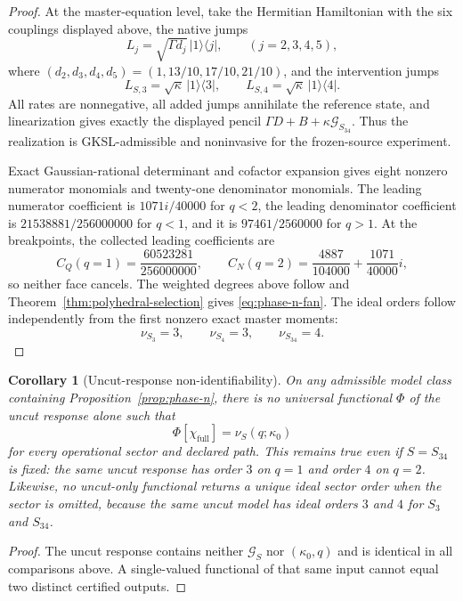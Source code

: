 \documentclass[11pt]{article}
\newtheorem{corollary}[theorem]{Corollary}
\theoremstyle{definition}
\theoremstyle{remark}
\theoremstyle{plain}
\newcommand{\full}{\mathrm{full}}
\newcommand{\Gcut}{\mathcal G}
\begin{document}
\begin{proof}
At the master-equation level, take the Hermitian Hamiltonian with the six
couplings displayed above, the native jumps
\[
 L_j=\sqrt{\Gamma d_j}\,\lvert1\rangle\langle j\rvert,
 \qquad
 (j=2,3,4,5),
\]
where $(d_2,d_3,d_4,d_5)=(1,13/10,17/10,21/10)$, and the intervention jumps
\[
 L_{S,3}=\sqrt{\kappa}\,\lvert1\rangle\langle3\rvert,
 \qquad
 L_{S,4}=\sqrt{\kappa}\,\lvert1\rangle\langle4\rvert.
\]
All rates are nonnegative, all added jumps annihilate the reference state,
and linearization gives exactly the displayed pencil
$\Gamma D+B+\kappa\Gcut_{S_{34}}$.  Thus the realization is
GKSL-admissible and noninvasive for the frozen-source experiment.

Exact Gaussian-rational determinant and cofactor expansion gives eight
nonzero numerator monomials and twenty-one denominator monomials.  The
leading numerator coefficient is
$1071i/40000$ for $q<2$, the leading denominator coefficient is
$21538881/256000000$ for $q<1$, and it is $97461/2560000$ for $q>1$.
At the breakpoints, the collected leading coefficients are
\[
 C_Q(q=1)=\frac{60523281}{256000000},\qquad
 C_N(q=2)=\frac{4887}{104000}+\frac{1071}{40000}i,
\]
so neither face cancels.  The weighted degrees above follow and
Theorem~\ref{thm:polyhedral-selection} gives
\eqref{eq:phase-n-fan}.  The ideal orders follow independently from the
first nonzero exact master moments:
\[
 \nu_{S_3}=3,\qquad \nu_{S_4}=3,\qquad \nu_{S_{34}}=4.
\]
\end{proof}

\begin{corollary}[Uncut-response non-identifiability]
\label{cor:nonidentifiability}
On any admissible model class containing Proposition~\ref{prop:phase-n},
there is no universal functional $\Phi$ of the uncut response alone such that
\[
 \Phi[\chi_{\full}]=\nu_S(q;\kappa_0)
\]
for every operational sector and declared path.  This remains true even if
$S=S_{34}$ is fixed: the same uncut response has order $3$ on $q=1$ and
order $4$ on $q=2$.  Likewise, no uncut-only functional returns a unique
ideal sector order when the sector is omitted, because the same uncut model
has ideal orders $3$ and $4$ for $S_3$ and $S_{34}$.
\end{corollary}

\begin{proof}
The uncut response contains neither $\Gcut_S$ nor $(\kappa_0,q)$ and is
identical in all comparisons above.  A single-valued functional of that same
input cannot equal two distinct certified outputs.
\end{proof}
\end{document}
